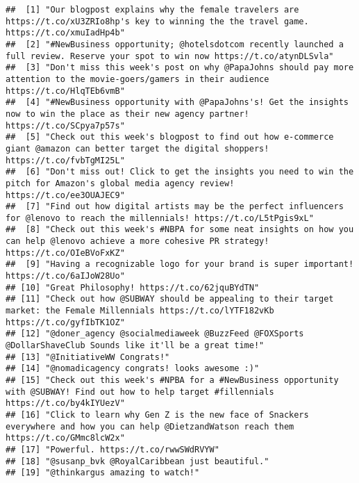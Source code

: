 \documentclass[]{article}
\begin{document}
\begin{verbatim}
##  [1] "Our blogpost explains why the female travelers are https://t.co/xU3ZRIo8hp's key to winning the the travel game. https://t.co/xmuIadHp4b"   
##  [2] "#NewBusiness opportunity; @hotelsdotcom recently launched a full review. Reserve your spot to win now https://t.co/atynDLSvla"              
##  [3] "Don't miss this week's post on why @PapaJohns should pay more attention to the movie-goers/gamers in their audience https://t.co/HlqTEb6vmB"
##  [4] "#NewBusiness opportunity with @PapaJohns's! Get the insights now to win the place as their new agency partner! https://t.co/SCpya7p57s"     
##  [5] "Check out this week's blogpost to find out how e-commerce giant @amazon can better target the digital shoppers! https://t.co/fvbTgMI25L"    
##  [6] "Don't miss out! Click to get the insights you need to win the pitch for Amazon's global media agency review! https://t.co/ee3OUAJEC9"       
##  [7] "Find out how digital artists may be the perfect influencers for @lenovo to reach the millennials! https://t.co/L5tPgis9xL"                  
##  [8] "Check out this week's #NBPA for some neat insights on how you can help @lenovo achieve a more cohesive PR strategy! https://t.co/OIeBVoFxKZ"
##  [9] "Having a recognizable logo for your brand is super important! https://t.co/6aIJoW28Uo"                                                       
## [10] "Great Philosophy! https://t.co/62jquBYdTN"                                                                                                   
## [11] "Check out how @SUBWAY should be appealing to their target market: the Female Millennials https://t.co/lYTF182vKb https://t.co/gyfIbTK1OZ"   
## [12] "@doner_agency @socialmediaweek @BuzzFeed @FOXSports @DollarShaveClub Sounds like it'll be a great time!"                                     
## [13] "@InitiativeWW Congrats!"                                                                                                                     
## [14] "@nomadicagency congrats! looks awesome :)"                                                                                                   
## [15] "Check out this week's #NPBA for a #NewBusiness opportunity with @SUBWAY! Find out how to help target #fillennials https://t.co/by4kIYUezV"  
## [16] "Click to learn why Gen Z is the new face of Snackers everywhere and how you can help @DietzandWatson reach them https://t.co/GMmc8lcW2x"    
## [17] "Powerful. https://t.co/rwwSWdRVYW"                                                                                                           
## [18] "@susanp_bvk @RoyalCaribbean just beautiful."                                                                                                 
## [19] "@thinkargus amazing to watch!"
\end{verbatim}
\end{document}
